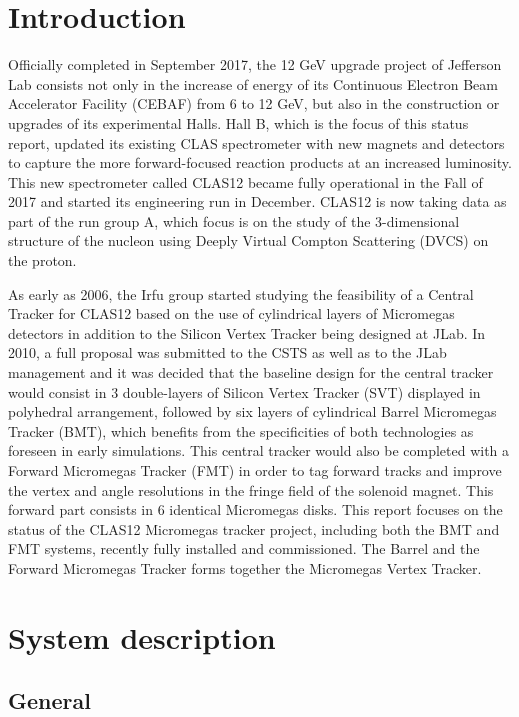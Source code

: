 \section{Introduction}
Officially completed in September 2017, the 12 GeV upgrade project of Jefferson Lab consists not only in the increase 
of energy of its Continuous Electron Beam Accelerator Facility (CEBAF) from 6 to 12 GeV, but also in the construction 
or upgrades of its experimental Halls. Hall B, which is the focus of this status report, updated its existing CLAS 
spectrometer with new magnets and detectors to capture the more forward-focused reaction products at an increased 
luminosity. This new spectrometer called CLAS12 became fully operational in the Fall of 2017 and started its 
engineering run in December. CLAS12 is now taking data as part of the run group A, which focus is on the study of the 
3-dimensional structure of the nucleon using Deeply Virtual Compton Scattering (DVCS) on the proton.

As early as 2006, the Irfu group started studying the feasibility of a Central Tracker for CLAS12 based on the use of 
cylindrical layers of Micromegas detectors in addition to the Silicon Vertex Tracker being designed at JLab. In 2010, a 
full proposal was submitted to the CSTS as well as to the JLab management and it was decided that the baseline design 
for the central tracker would consist in 3 double-layers of Silicon Vertex Tracker (SVT) displayed in polyhedral 
arrangement, followed by six layers of cylindrical Barrel Micromegas Tracker (BMT), which benefits from the 
specificities of both technologies as foreseen in early simulations. This central tracker would also be completed with 
a Forward Micromegas Tracker (FMT) in order to tag forward tracks and improve the vertex and angle resolutions in the 
fringe field of the solenoid magnet. This forward part consists in 6 identical Micromegas disks. This report focuses on 
the status of the CLAS12 Micromegas tracker project, including both the BMT and FMT systems, recently fully installed 
and commissioned. The Barrel and the Forward Micromegas Tracker forms together the Micromegas Vertex Tracker.

\section{System description}

\subsection{General}


